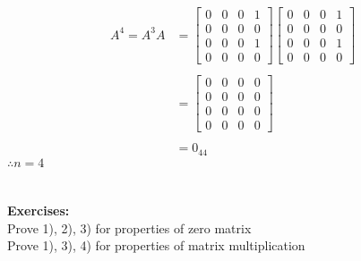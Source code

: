 \documentclass{jhwhw}
\theoremstyle{definition}
\theoremstyle{remark}
\theoremstyle{example}
\begin{document}
\begin{align*} 
    A^4 = A^3 A &= \begin{bmatrix} 0 & 0 & 0 & 1 \\ 0 & 0 & 0 & 0 \\ 0 & 0 & 0 & 1 \\ 0 & 0 & 0 & 0 \end{bmatrix} \begin{bmatrix}  0 & 0 & 0 & 1 \\ 0 & 0 & 0 & 0 \\ 0 & 0 & 0 & 1 \\ 0 & 0 & 0 & 0  \end{bmatrix}\\ \\
    &= \begin{bmatrix}  0 & 0 & 0 & 0 \\ 0 & 0 & 0 & 0 \\ 0 & 0 & 0 & 0\\ 0 & 0 & 0 & 0\end{bmatrix} \\ \\
&= 0_{44}
\end{align*}
\(\boxed{\therefore n = 4}\)
\\ \\ \\

\textbf{Exercises:}\\
Prove 1), 2), 3) for properties of zero matrix\\
Prove 1), 3), 4) for properties of matrix multiplication
\end{document}
